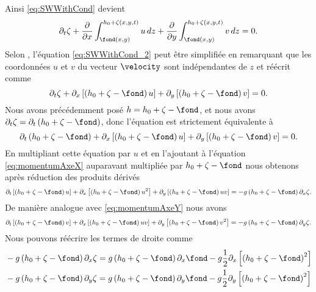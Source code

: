 Ainsi \eqref{eq:SWWithCond} devient
\begin{equation}
	\partial_t \zeta + \frac{\partial}{\partial x} \int_{\fond(x, y)}^{h_0 + \zeta(x, y, t)} u\,dz + \frac{\partial}{\partial y} \int_{\fond(x, y)}^{h_0 + \zeta(x, y, t)} v \, dz = 0.\label{eq:SWWithCond_2}
\end{equation}
Selon \citet{toro_riemann_2009}, l'équation \eqref{eq:SWWithCond_2} peut être simplifiée en remarquant que les coordonnées $u$ et $v$ du vecteur $\velocity$ sont indépendantes de $z$ et réécrit comme
\begin{equation}
	\partial_t \zeta + \partial_x\left[\left(h_0 + \zeta - \fond \right)u\right] + \partial_y\left[\left(h_0 + \zeta - \fond \right)v\right] = 0.
\end{equation}
Nous avons précédemment posé $h = h_0 + \zeta - \fond$, et nous avons $\partial_t \zeta = \partial_t \left(h_0 + \zeta-\fond\right)$, donc l'équation est strictement équivalente à
\begin{equation}
\partial_t \left(h_0 + \zeta-\fond\right) + \partial_x\left[\left(h_0 + \zeta - \fond \right)u\right] + \partial_y\left[\left(h_0 + \zeta - \fond \right)v\right] = 0.\label{eq:firstSWE}
\end{equation}
En multipliant cette équation par $u$ et en l'ajoutant à l'équation \eqref{eq:momentumAxeX} auparavant multipliée par $h_0 + \zeta - \fond$ nous obtenons après réduction des produits dérivés
\begin{equation}
	\partial_t \left[\left(h_0 + \zeta - \fond\right) u \right] + \partial_x \left[\left(h_0 + \zeta - \fond\right)u^2\right] + \partial_y \left[\left(h_0+\zeta-\fond\right)uv\right] = - g \left(h_0 + \zeta - \fond \right)\partial_x\zeta.\label{eq:SWE_temp1}
\end{equation}
De manière analogue avec \eqref{eq:momentumAxeY} nous avons
\begin{equation}
\partial_t \left[\left(h_0 + \zeta - \fond\right) v \right] + \partial_x \left[\left(h_0 + \zeta - \fond\right)uv\right] + \partial_y \left[\left(h_0+\zeta-\fond\right)v^2\right] = - g \left(h_0 + \zeta - \fond \right)\partial_y\zeta.\label{eq:SWE_temp2}
\end{equation}
Nous pouvons réécrire les termes de droite comme
\begin{align}
	&- g \left(h_0 + \zeta - \fond \right)\partial_x\zeta = g\left( h_0 + \zeta - \fond\right)\partial_x \fond - g\frac{1}{2}\partial_x\left[\left(h_0 + \zeta - \fond\right)^2\right] \\
	& - g \left(h_0 + \zeta - \fond \right)\partial_y\zeta = g\left( h_0 + \zeta - \fond\right)\partial_y \fond - g\frac{1}{2}\partial_y\left[\left(h_0 + \zeta - \fond\right)^2\right]
\end{align}
